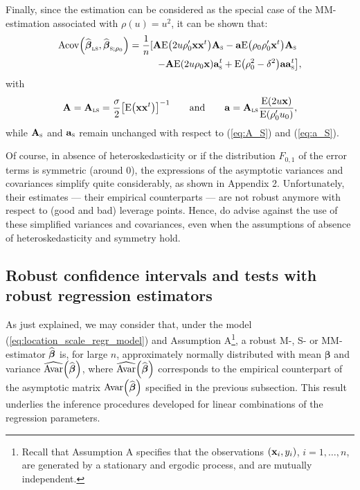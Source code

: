 \begin{stremark}
Finally, since the  estimation can be considered as the special case of the
MM-estimation associated with $\rho(u)=u^{2}$, it can be shown that:%
\begin{align}
\mathrm{Acov}\left(  \sthat{\boldsymbol\beta}_{\stsc{LS}},\widehat
{\boldsymbol\beta}_{\stsc{S};\rho_{0}}\right)   &  =\frac{1}{n}%
[\mathbf{A}\mathrm{E}\left(  2u\rho_{0}^{\prime}\mathbf{xx}^{t}\right)
\mathbf{A}_{\stsc{S}}-\mathbf{a}\mathrm{E}\left(  \rho_{0}\rho_{0}^{\prime
}\stvec{x}^{t}\right)  \mathbf{A}_{\stsc{S}}\label{eq:Acov_betahat_LS_S}\\
&  \hspace*{1cm}\left.  -\mathbf{A}\mathrm{E}\left(  2u\rho_{0}\stvec{x}%
\right)  \mathbf{a}_{\stsc{S}}^{t}+\mathrm{E}\left(  \rho_{0}^{2}-\delta
^{2}\right)  \mathbf{aa}_{\stsc{S}}^{t}\right]  ,\nonumber
\end{align}
with%
\[
\mathbf{A}=\mathbf{A}_{\stsc{LS}}=\frac{\sigma}{2}\left[  \mathrm{E}\left(
\mathbf{xx}^{t}\right)  \right]  ^{-1}\qquad\text{and\qquad}\mathbf{a}%
=\mathbf{A}_{\stsc{LS}}\frac{\mathrm{E}\left(  2u\stvec{x}\right)
}{\mathrm{E}\left(  \rho_{0}^{\prime}u_{0}\right)  },
\]
while $\mathbf{A}_{\stsc{S}}$ and $\mathbf{a}_{\stsc{S}}$ remain unchanged
with respect to (\ref{eq:A_S}) and (\ref{eq:a_S}).
\end{stremark}

Of course, in absence of heteroskedasticity or if the distribution $F_{0,1}$
of the error terms is symmetric (around 0), the expressions of the asymptotic
variances and covariances simplify quite considerably, as shown in Appendix 2.
Unfortunately, their estimates --- their empirical counterparts --- are not
robust anymore with respect to (good and bad) leverage points. Hence, 
\citet{Croux:2003} do advise against the use of these simplified variances
and covariances, even when the assumptions of absence of heteroskedasticity
and symmetry hold.

\bigskip

\subsection{Robust confidence intervals and tests with robust regression estimators}

As just explained, we may consider that, under the model
(\ref{eq:location_scale_regr_model}) and Assumption A\footnote{Recall that
Assumption A specifies that the observations $\left(  \stvec{x}_{i}%
,y_{i}\right)  $, $i = 1, \dots, n$, are generated by a stationary and ergodic
process, and are mutually independent.}, a robust M-, S- or MM-estimator
$\widehat{\boldsymbol\beta}$ is, for large $n$, approximately normally
distributed with mean $\boldsymbol\beta$ and variance $\widehat
{\mathrm{Avar}}\left(  \sthat{\boldsymbol\beta}\right)  $, where
$\sthat{\mathrm{Avar}}\left(  \sthat{\boldsymbol\beta}\right)  $
corresponds to the empirical counterpart of the asymptotic matrix
$\mathrm{Avar}\left(  \sthat{\boldsymbol\beta}\right)  $ specified in the
previous subsection. This result underlies the inference procedures developed
for linear combinations of the regression parameters.

